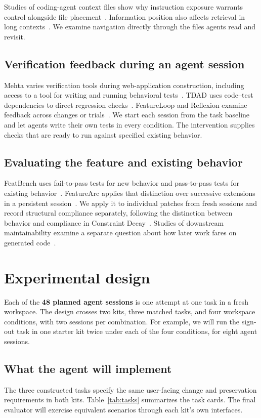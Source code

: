 \documentclass[11pt,a4paper]{article}
\begin{document}
Studies of coding-agent context files show why instruction exposure warrants control alongside file placement~\cite{khatri2026context,gloaguen2026agents}. Information position also affects retrieval in long contexts~\cite{liu2024lost}. We examine navigation directly through the files agents read and revisit.

\subsection{Verification feedback during an agent session}
Mehta varies verification tools during web-application construction, including access to a tool for writing and running behavioral tests~\cite{mehta2026verification}. TDAD uses code--test dependencies to direct regression checks~\cite{alonso2026tdad}. FeatureLoop and Reflexion examine feedback across changes or trials~\cite{feng2026featureloop,shinn2023reflexion}. We start each session from the task baseline and let agents write their own tests in every condition. The intervention supplies checks that are ready to run against specified existing behavior.

\subsection{Evaluating the feature and existing behavior}
FeatBench uses fail-to-pass tests for new behavior and pass-to-pass tests for existing behavior~\cite{chen2026featbench}. FeatureArc applies that distinction over successive extensions in a persistent session~\cite{wang2026featurearc}. We apply it to individual patches from fresh sessions and record structural compliance separately, following the distinction between behavior and compliance in Constraint Decay~\cite{dente2026constraint}. Studies of downstream maintainability examine a separate question about how later work fares on generated code~\cite{patel2026codethread,borg2026echoes}.

\section{Experimental design}\label{sec:method}
Each of the \textbf{48 planned agent sessions} is one attempt at one task in a fresh workspace. The design crosses two kits, three matched tasks, and four workspace conditions, with two sessions per combination. For example, we will run the sign-out task in one starter kit twice under each of the four conditions, for eight agent sessions.
\subsection{What the agent will implement}
The three constructed tasks specify the same user-facing change and preservation requirements in both kits. Table~\ref{tab:tasks} summarizes the task cards. The final evaluator will exercise equivalent scenarios through each kit's own interfaces.
\end{document}
